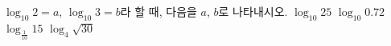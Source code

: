 $\log_{10} 2=a$, $\log_{10} 3=b$라 할 때, 다음을 $a$, $b$로 나타내시오.
 $\log_{10} 25$
 $\log_{10} 0.72$
 $\log_{\frac{1}{10}} 15$
 $\log_4 \sqrt{30}$
